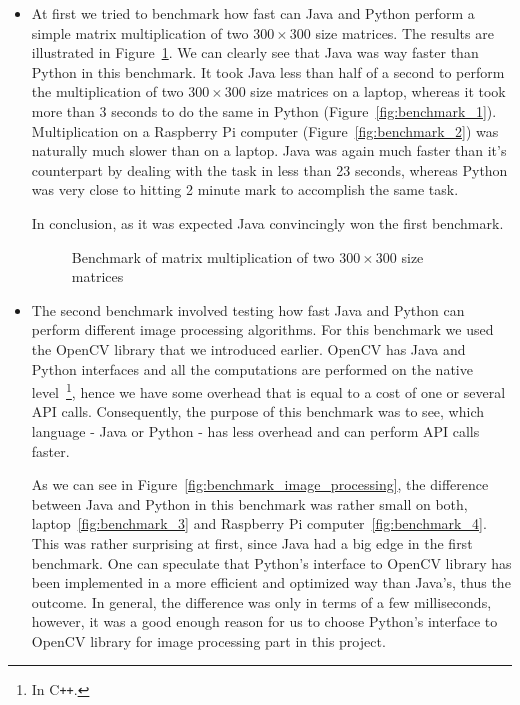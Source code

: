 \begin{itemize}
\item At first we tried to benchmark how fast can Java and Python perform a simple matrix multiplication of two $300 \times 300$ size matrices. The results are illustrated in Figure~\ref{fig:benchmark_multiplication}. We can clearly see that Java was way faster than Python in this benchmark. It took Java less than half of a second to perform the multiplication of two $300 \times 300$ size matrices on a laptop, whereas it took more than 3 seconds to do the same in Python (Figure~\ref{fig:benchmark_1}). Multiplication on a Raspberry Pi computer (Figure~\ref{fig:benchmark_2}) was naturally much slower than on a laptop. Java was again much faster than it's counterpart by dealing with the task in less than 23 seconds, whereas Python was very close to hitting 2 minute mark to accomplish the same task.

In conclusion, as it was expected Java convincingly won the first benchmark.

\begin{figure}[ht]
		\centering
		\quad
		\caption{Benchmark of matrix multiplication of two $300 \times 300$ size matrices}
		\label{fig:benchmark_multiplication}
\end{figure}

\item The second benchmark involved testing how fast Java and Python can perform different image processing algorithms. For this benchmark we used the OpenCV library that we introduced earlier. OpenCV has Java and Python interfaces and all the computations are performed on the native level~\footnote{In C\texttt{++}.}, hence we have some overhead that is equal to a cost of one or several API calls. Consequently, the purpose of this benchmark was to see, which language - Java or Python - has less overhead and can perform API calls faster. 

As we can see in Figure~\ref{fig:benchmark_image_processing}, the difference between Java and Python in this benchmark was rather small on both, laptop~\ref{fig:benchmark_3} and Raspberry Pi computer~\ref{fig:benchmark_4}. This was rather surprising at first, since Java had a big edge in the first benchmark. One can speculate that Python's interface to OpenCV library has been implemented in a more efficient and optimized way than Java's, thus the outcome. In general, the difference was only in terms of a few milliseconds, however, it was a good enough reason for us to choose Python's interface to OpenCV library for image processing part in this project.


\end{itemize}
